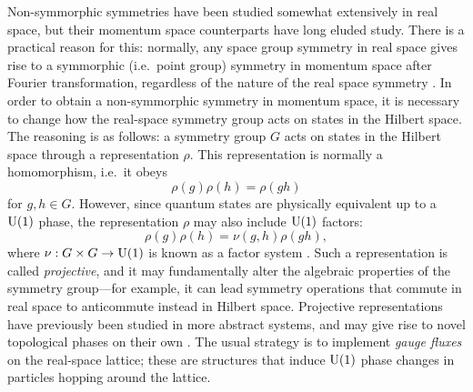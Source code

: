 Non-symmorphic symmetries have been studied somewhat extensively in real space, but their momentum space counterparts have long eluded study. There is a practical reason for this: normally, any space group symmetry in real space gives rise to a symmorphic (i.e.\ point group) symmetry in momentum space after Fourier transformation, regardless of the nature of the real space symmetry \cite{Zhang_nonsymmorphic}. In order to obtain a non-symmorphic symmetry in momentum space, it is necessary to change how the real-space symmetry group acts on states in the Hilbert space. The reasoning is as follows: a symmetry group $G$ acts on states in the Hilbert space through a representation $\rho$. This representation is normally a homomorphism, i.e.\ it obeys
\begin{equation*}
	\rho(g)\rho(h) = \rho(gh)
\end{equation*}
for $g,h\in G$. However, since quantum states are physically equivalent up to a $\operatorname{U}(1)$ phase, the representation $\rho$ may also include $\operatorname{U}(1)$ factors:
\begin{equation*}
	\rho(g)\rho(h) = \nu(g,h)\rho(gh),
\end{equation*}
where $\nu: G\times G\to \operatorname{U}(1)$ is known as a factor system \cite{Chen_gauge-classification}. Such a representation is called \emph{projective}, and it may fundamentally alter the algebraic properties of the symmetry group---for example, it can lead symmetry operations that commute in real space to anticommute instead in Hilbert space. Projective representations have previously been studied in more abstract systems, and may give rise to novel topological phases on their own \cite{ZHY_Z2-projective,Zhao_projective-PT,Shao_gauge,Xue-Wang_acoustic-Mobius,Li-Du_acoustic-Mobius,Chen_gauge-classification}. The usual strategy is to implement \emph{gauge fluxes} on the real-space lattice; these are structures that induce $\operatorname{U}(1)$ phase changes in particles hopping around the lattice. %

